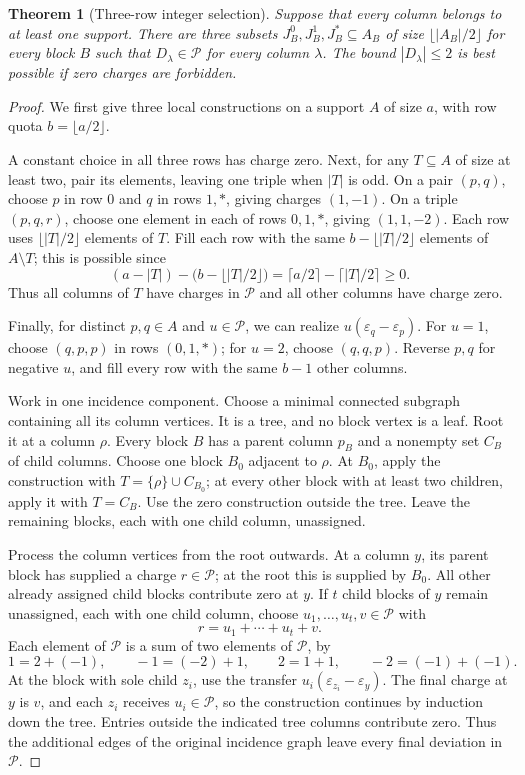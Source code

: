 \documentclass[11pt,reqno]{amsart}
\numberwithin{equation}{section}
\newtheorem{theorem}{Theorem}[section]
\theoremstyle{definition}
\theoremstyle{remark}
\begin{document}
\begin{theorem}[Three-row integer selection]\label{thm:integer-selector}
Suppose that every column belongs to at least one support. There are
three subsets $J_B^0,J_B^1,J_B^*\subseteq A_B$ of size
$\lfloor |A_B|/2\rfloor$ for every block $B$ such that
$D_\lambda\in\mathcal P$ for every column $\lambda$.
The bound $|D_\lambda|\le2$ is best possible if zero charges are forbidden.
\end{theorem}
\begin{proof}
We first give three local constructions on a support $A$ of size $a$,
with row quota $b=\lfloor a/2\rfloor$.

A constant choice in all three rows has charge zero. Next, for any
$T\subseteq A$ of size at least two, pair its elements, leaving one triple
when $|T|$ is odd. On a pair $(p,q)$, choose $p$ in row $0$ and $q$ in
rows $1,*$, giving charges $(1,-1)$. On a triple $(p,q,r)$, choose one
element in each of rows $0,1,*$, giving $(1,1,-2)$. Each row uses
$\lfloor |T|/2\rfloor$ elements of $T$. Fill each row with the same
$b-\lfloor |T|/2\rfloor$ elements of $A\setminus T$; this is possible since
\[
 (a-|T|)-\bigl(b-\lfloor |T|/2\rfloor\bigr)
 =\lceil a/2\rceil-\lceil |T|/2\rceil\ge0.
\]
Thus all columns of $T$ have charges in $\mathcal P$ and all other
columns have charge zero.

Finally, for distinct $p,q\in A$ and $u\in\mathcal P$, we can realize
$u(\varepsilon_q-\varepsilon_p)$. For $u=1$, choose $(q,p,p)$ in rows
$(0,1,*)$; for $u=2$, choose $(q,q,p)$. Reverse $p,q$ for negative $u$,
and fill every row with the same $b-1$ other columns.

Work in one incidence component. Choose a minimal connected subgraph
containing all its column vertices. It is a tree, and no block vertex is
a leaf. Root it at a column $\rho$. Every block $B$ has a parent column
$p_B$ and a nonempty set $C_B$ of child columns. Choose one block $B_0$
adjacent to $\rho$. At $B_0$, apply the construction with
$T=\{\rho\}\cup C_{B_0}$; at every other block with at least two
children, apply it with $T=C_B$. Use the zero construction outside the tree.
Leave the remaining blocks, each with one child column, unassigned.

Process the column vertices from the root outwards. At a column $y$,
its parent block has supplied a charge $r\in\mathcal P$; at the root this
is supplied by $B_0$. All other already assigned child blocks contribute
zero at $y$. If $t$ child blocks of $y$ remain unassigned, each with
one child column, choose
$u_1,\ldots,u_t,v\in\mathcal P$ with
\[
 r=u_1+\cdots+u_t+v.
\]
Each element of $\mathcal P$ is a sum of two elements of $\mathcal P$, by
\begin{equation}\label{eq:palette-splitting}
 1=2+(-1),\qquad -1=(-2)+1,\qquad
 2=1+1,\qquad -2=(-1)+(-1).
\end{equation}
At the block with sole child $z_i$, use the transfer
$u_i(\varepsilon_{z_i}-\varepsilon_y)$. The final charge at $y$ is $v$,
and each $z_i$ receives $u_i\in\mathcal P$, so the construction
continues by induction down the tree. Entries outside the indicated
tree columns contribute zero. Thus the additional edges of the original
incidence graph leave every final deviation in $\mathcal P$.


\end{proof}
\end{document}
